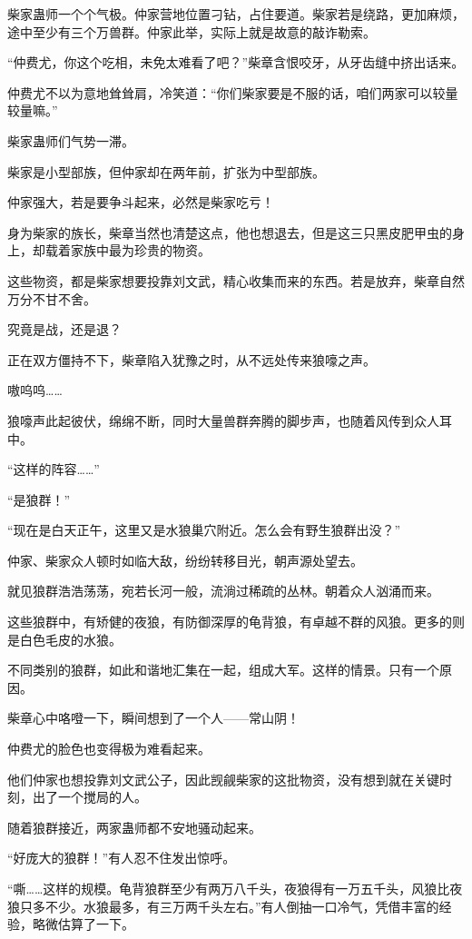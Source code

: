 \begin{this_body}
柴家蛊师一个个气极。仲家营地位置刁钻，占住要道。柴家若是绕路，更加麻烦，途中至少有三个万兽群。仲家此举，实际上就是故意的敲诈勒索。

“仲费尤，你这个吃相，未免太难看了吧？”柴章含恨咬牙，从牙齿缝中挤出话来。

仲费尤不以为意地耸耸肩，冷笑道：“你们柴家要是不服的话，咱们两家可以较量较量嘛。”

柴家蛊师们气势一滞。

柴家是小型部族，但仲家却在两年前，扩张为中型部族。

仲家强大，若是要争斗起来，必然是柴家吃亏！

身为柴家的族长，柴章当然也清楚这点，他也想退去，但是这三只黑皮肥甲虫的身上，却载着家族中最为珍贵的物资。

这些物资，都是柴家想要投靠刘文武，精心收集而来的东西。若是放弃，柴章自然万分不甘不舍。

究竟是战，还是退？

正在双方僵持不下，柴章陷入犹豫之时，从不远处传来狼嚎之声。

嗷呜呜……

狼嚎声此起彼伏，绵绵不断，同时大量兽群奔腾的脚步声，也随着风传到众人耳中。

“这样的阵容……”

“是狼群！”

“现在是白天正午，这里又是水狼巢穴附近。怎么会有野生狼群出没？”

仲家、柴家众人顿时如临大敌，纷纷转移目光，朝声源处望去。

就见狼群浩浩荡荡，宛若长河一般，流淌过稀疏的丛林。朝着众人汹涌而来。

这些狼群中，有矫健的夜狼，有防御深厚的龟背狼，有卓越不群的风狼。更多的则是白色毛皮的水狼。

不同类别的狼群，如此和谐地汇集在一起，组成大军。这样的情景。只有一个原因。

柴章心中咯噔一下，瞬间想到了一个人——常山阴！

仲费尤的脸色也变得极为难看起来。

他们仲家也想投靠刘文武公子，因此觊觎柴家的这批物资，没有想到就在关键时刻，出了一个搅局的人。

随着狼群接近，两家蛊师都不安地骚动起来。

“好庞大的狼群！”有人忍不住发出惊呼。

“嘶……这样的规模。龟背狼群至少有两万八千头，夜狼得有一万五千头，风狼比夜狼只多不少。水狼最多，有三万两千头左右。”有人倒抽一口冷气，凭借丰富的经验，略微估算了一下。


\end{this_body}
